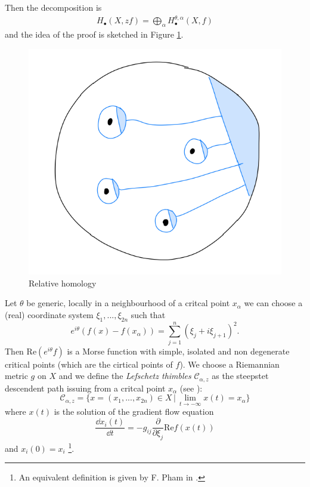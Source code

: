 \documentclass[11pt,a4paper,twoside,leqno,noamsfonts]{amsart}
\numberwithin{equation}{section}
\begin{document}
Then the decomposition is 
\begin{align}\label{decomposition H_B}
H_\bullet(X,zf)=\bigoplus_{\alpha}H_\bullet^{\theta,\alpha}(X,f)
\end{align}     
and the idea of the proof is sketched in Figure \ref{fig:relative_homology}.
\begin{figure}[h]
\includegraphics[scale=0.3]{Cattura2}
\caption{Relative homology}\label{fig:relative_homology}
\end{figure}

Let $\theta$ be generic, locally in a neighbourhood of a critcal point $x_\alpha$ we can choose a (real) coordinate system $\xi_1,...,\xi_{2n}$ such that \[e^{i\theta}\left(f(x)-f(x_\alpha)\right)=\sum_{j=1}^n(\xi_j+i\xi_{j+1})^2.\] Then $\mathrm{Re}(e^{i\theta}f)$ is a Morse function with simple, isolated and non degenerate critical points (which are the cirtical points of $f$). We choose a Riemannian metric $g$ on $X$ and we define the \textit{Lefschetz thimbles} $\mathcal{C}_{\alpha,z}$ as the steepstet descendent path issuing from a critcal point $x_\alpha$ (see \cite{Witten}): 
\begin{equation}
\mathcal{C}_{\alpha,z}=\lbrace x=(x_1,...,x_{2n})\in X\,\big\vert \, \lim_{t\to -\infty} x(t)=x_\alpha\rbrace
\end{equation}
where $x(t)$ is the solution of the gradient flow equation \[\frac{\dd x_i(t)}{\dd t}=-g_{ij}\frac{\partial}{\partial \xi_j}\mathrm{Re}f(x(t))\] and $x_i(0)=x_i$ \footnote{An equivalent definition is given by F. Pham in \cite{pham}.}. 
\end{document}
